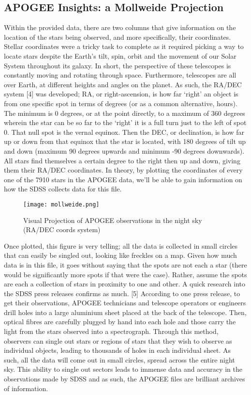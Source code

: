 \documentclass{article}
\begin{document}
\subsection*{APOGEE Insights: a Mollweide Projection}
\indent Within the provided data, there are two columns that give information on the location of the stars being observed, and more specifically, their coordinates. Stellar coordinates were a tricky task to complete as it required picking a way to locate stars despite the Earth’s tilt, spin, orbit and the movement of our Solar System throughout its galaxy. In short, the perspective of these telescopes is constantly moving and rotating through space. Furthermore, telescopes are all over Earth, at different heights and angles on the planet. As such, the RA/DEC system [4] was developed; RA, or right-ascension, is how far ‘right’ an object is from one specific spot in terms of degrees (or as a common alternative, hours). The minimum is 0 degrees, or at the point directly, to a maximum of 360 degrees wherein the star can be so far to the ‘right’ it is a full turn just to the left of spot 0. That null spot is the vernal equinox. Then the DEC, or declination, is how far up or down from that equinox that the star is located, with 180 degrees of tilt up and down (maximum 90 degrees upwards and minimum -90 degrees downwards). All stars find themselves a certain degree to the right then up and down, giving them their RA/DEC coordinates. In theory, by plotting the coordinates of every one of the 7910 stars in the APOGEE data, we’ll be able to gain information on how the SDSS collects data for this file. \\
\begin{figure}[H]
    \centering
    \texttt{[image: mollweide.png]}
    \caption{Visual Projection of APOGEE observations in the night sky (RA/DEC coords system)}
    \label{fig:4}
\end{figure}
\indent Once plotted, this figure is very telling; all the data is collected in small circles that can easily be singled out, looking like freckles on a map. Given how much data is in this file, it goes without saying that the spots are not each a star (there would be significantly more spots if that were the case). Rather, assume the spots are each a collection of stars in proximity to one and other. A quick research into the SDSS press releases confirms as much. [5] According to one press release, to get their observations, APOGEE technicians and telescope operators or engineers drill holes into a large aluminium sheet placed at the back of the telescope. Then, optical fibres are carefully plugged by hand into each hole and those carry the light from the stars observed into a spectrograph. Through this method, observers can single out stars or regions of stars that they wish to observe as individual objects, leading to thousands of holes in each individual sheet. As such, all the data will come out in small circles, spread across the entire night sky. This ability to single out sectors leads to immense data and accuracy in the observations made by SDSS and as such, the APOGEE files are brilliant archives of information. \\
\end{document}
